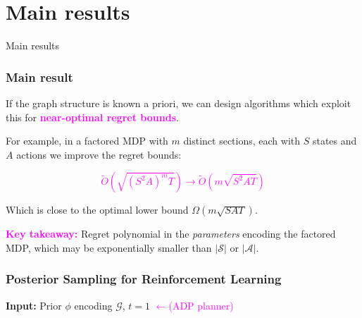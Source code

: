 \documentclass{beamer}
\newcommand{\Gc}{\mathcal{G}}
\newcommand{\Sc}{\mathcal{S}}
\newcommand{\Ac}{\mathcal{A}}
\newcommand{\bspace}{\vspace{3mm}}
\newcommand{\hilite}[1]{\textcolor{magenta}{\textbf{#1}}}
\begin{document}
\section{Main results}

\begin{frame}
\begin{block}{\Huge{Main results}}
\end{block}
\end{frame}

\begin{frame}
\frametitle{Main result}
    If the graph structure is known a priori, we can design algorithms which exploit this for \hilite{near-optimal regret bounds}.

    \bspace
    For example, in a factored MDP with $m$ distinct sections, each with $S$ states and $A$ actions we improve the regret bounds:

    \hilite{$$ \tilde{O} \left(\sqrt{(S^2 A)^m T} \right) \rightarrow
    \tilde{O} \left( m \sqrt{S^2 A T}\right) $$}

    Which is close to the optimal lower bound $\Omega(m \sqrt{SAT})$.

    \bspace
    \hilite{Key takeaway:} Regret polynomial in the \emph{parameters} encoding the factored MDP, which may be exponentially smaller than $|\Sc|$ or $|\Ac|$.
\end{frame}

\begin{frame}
\frametitle{Posterior Sampling for Reinforcement Learning}

\begin{algorithm}[H]
\label{alg: PSRL}

\begin{algorithmic}[1]
    \STATE \textbf{Input: }Prior $\phi$ encoding $\Gc$, $t=1$
          \textcolor{magenta}{$\leftarrow$(ADP planner)}

        \ENDFOR

    \ENDFOR
\end{algorithmic}
\end{algorithm}
\end{frame}
\end{document}
